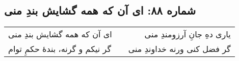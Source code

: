 \begin{center}
\section*{شماره ۸۸: ای آن که همه گشایش بندِ منی}
\label{sec:088}
\begin{longtable}{l p{0.5cm} r}
ای آن که همه گشایش بندِ منی
&&
یاری دهِ جانِ آرزومندِ منی
\\
گر نیکم و گرنه، بندهٔ حکمِ توام
&&
گر فضل کنی ورنه خداوندِ منی
\\
\end{longtable}
\end{center}
